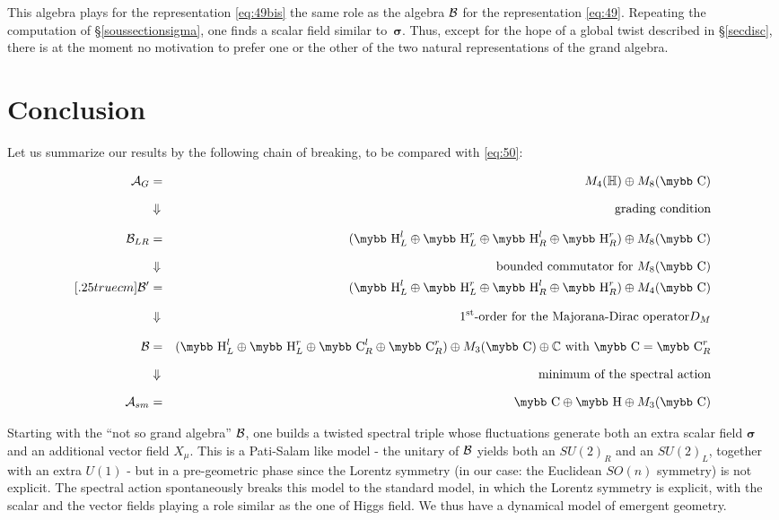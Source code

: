 \documentclass[11pt]{article}
\newcommand{\A}{\mathcal A}
\newcommand{\sig}{{\boldsymbol{\sigma}}}
\def\bb#1{\hbox{\mybb#1}}
\begin{document}
This algebra plays for the representation \eqref{eq:49bis} the same role
as the algebra $\cal B$  for the representation
\eqref{eq:49}. Repeating the computation of \S\ref{soussectionsigma},
one finds a scalar field similar to~$\sig$. 
Thus, except for the hope of a global twist described in \S\ref{secdisc},
there is  at the moment no motivation to prefer one or the other of the two natural
representations of the grand algebra.
 
\section{Conclusion}\setcounter{equation}{0}

Let us summarize our results by the following chain of breaking, to be compared with \eqref{eq:50}:
\begin{framed}
  \begin{eqnarray*}
    \label{eq:final}
\mathcal{A}_{G}&=& M_4(\mathbb{H}) \oplus M_8(\bb C) \\[.25truecm] 
\nonumber 
&\Downarrow& \hspace{0truecm}\text{grading condition}\\[.25truecm] 
\nonumber
{\cal B}_{LR} &=&(\bb H^l_L\oplus \bb H^r_L\oplus \bb H^l_R\oplus \bb H^r_R) \oplus M_8(\bb C)\\[.25truecm]  
\nonumber 
&\Downarrow& \hspace{0truecm}
\text{ bounded commutator for } M_8(\bb C)\\ [.25truecm] 
\nonumber
{\cal B}' &=&(\bb H^l_L\oplus \bb H^r_L\oplus \bb H^l_R\oplus \bb H^r_R) \oplus M_4(\bb C) \\[.25truecm] 
\nonumber 
&\Downarrow&\hspace{0truecm} \text{$1^\text{st}$-order for the
  Majorana-Dirac operator} D_M\\[.25truecm]
\nonumber
 {\cal B} &=&(\bb H^l_L\oplus \bb H^r_L\oplus \bb C^l_R\oplus \bb C^r_R) \oplus M_3(\bb C)\oplus \mathbb C
 \text{ with } \bb C = \bb C_R^r \\[.25truecm] 
\nonumber 
&\Downarrow&\hspace{0truecm} \text{minimum of the spectral action}\\[.25truecm] 
\A_{sm} &=&\bb C \oplus \bb H \oplus M_3(\bb C)
\end{eqnarray*}
\end{framed}
\medskip

Starting with the ``not so grand algebra'' $\cal B$, one builds a
twisted spectral triple whose fluctuations generate both an extra
scalar field $\boldsymbol \sigma$ and an additional vector field
$X_\mu$. This is a Pati-Salam like model - the unitary of $\cal
B$ yields both an $SU(2)_R$ and an $SU(2)_L$, together with an extra $U(1)$ - but in a pre-geometric
phase since the Lorentz symmetry (in our case: the Euclidean $SO(n)$ symmetry) is
not explicit. The spectral action spontaneously breaks this model to
the standard model, in which the Lorentz symmetry is explicit, with the scalar and the vector fields playing
a role similar as the one of Higgs field. We thus have a dynamical model of emergent geometry.
\medskip
\end{document}
